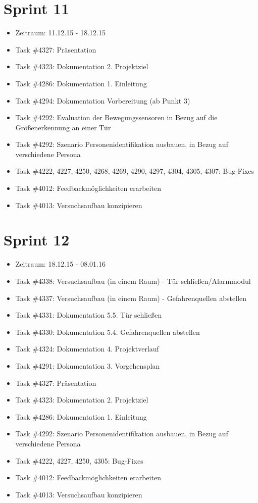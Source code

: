\documentclass[12pt, oneside, smallheadings]{scrbook}
\begin{document}
\section{Sprint 11}
\begin{itemize}
	\item Zeitraum: 11.12.15 - 18.12.15 \newline
	\item Task \#4327: Präsentation
	\item Task \#4323: Dokumentation 2. Projektziel
	\item Task \#4286: Dokumentation 1. Einleitung
	\item Task \#4294: Dokumentation Vorbereitung (ab Punkt 3)
	\item Task \#4292: Evaluation der Bewegungssensoren in Bezug auf die Größenerkennung an einer Tür
	\item Task \#4292: Szenario Personenidentifikation ausbauen, in Bezug auf verschiedene Persona
	\item Task \#4222, 4227, 4250, 4268, 4269, 4290, 4297, 4304, 4305, 4307: Bug-Fixes
	\item Task \#4012: Feedbackmöglichkeiten erarbeiten
	\item Task \#4013: Versuchsaufbau konzipieren
\end{itemize}

\section{Sprint 12}
\begin{itemize}
	\item Zeitraum: 18.12.15 - 08.01.16 \newline
	\item Task \#4338: Versuchsaufbau (in einem Raum) - Tür schließen/Alarmmodul
	\item Task \#4337: Versuchsaufbau (in einem Raum) - Gefahrenquellen abstellen
	\item Task \#4331: Dokumentation 5.5. Tür schließen
	\item Task \#4330: Dokumentation 5.4. Gefahrenquellen abstellen
	\item Task \#4324: Dokumentation 4. Projektverlauf
	\item Task \#4291: Dokumentation 3. Vorgehensplan
	\item Task \#4327: Präsentation
	\item Task \#4323: Dokumentation 2. Projektziel
	\item Task \#4286: Dokumentation 1. Einleitung
	\item Task \#4292: Szenario Personenidentifikation ausbauen, in Bezug auf verschiedene Persona
	\item Task \#4222, 4227, 4250, 4305: Bug-Fixes
	\item Task \#4012: Feedbackmöglichkeiten erarbeiten
	\item Task \#4013: Versuchsaufbau konzipieren
\end{itemize}
\end{document}
